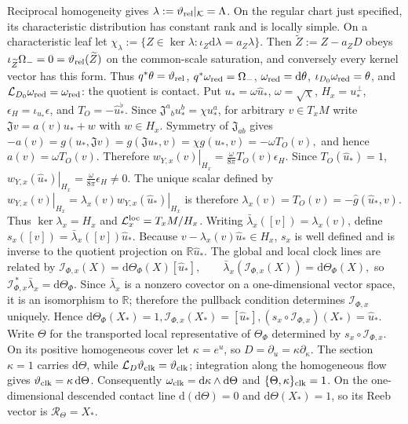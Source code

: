 \documentclass[aps,prl,reprint]{revtex4-2}
\newcommand{\dd}{\mathrm d}
\newcommand{\Lie}{\mathcal L}
\newcommand{\cK}{\mathcal K}
\begin{document}
Reciprocal homogeneity gives $\lambda:=\vartheta_{\rm rel}|_{\cK}=\Lambda$. On the regular chart just specified, its characteristic distribution has constant rank and is locally simple. On a characteristic leaf let $\chi_\lambda:=\{Z\in\ker\lambda:\iota_Z\dd\lambda=a_Z\lambda\}$. Then $\widetilde Z:=Z-a_ZD$ obeys $\iota_{\widetilde Z}\Omega_-=0=\vartheta_{\rm rel}(\widetilde Z)$ on the common-scale saturation, and conversely every kernel vector has this form. Thus $q^*\theta=\vartheta_{\rm rel}$, $q^*\omega_{\rm red}=\Omega_-$, $\omega_{\rm red}=\dd\theta$, $\iota_{D_0}\omega_{\rm red}=\theta$, and $\Lie_{D_0}\omega_{\rm red}=\omega_{\rm red}$: the quotient is contact. Put $u_*=\omega\widehat u_*$, $\omega=\sqrt{\chi}$, $H_x=u_*^\perp$, $\epsilon_H=\iota_{u_*}\epsilon$, and $T_O=-\widehat u_*^\flat$. Since $\mathfrak J^a{}_bu_*^b=\chi u_*^a$, for arbitrary $v\in T_xM$ write $\mathfrak Jv=a(v)u_*+w$ with $w\in H_x$. Symmetry of $\mathfrak J_{ab}$ gives
$-a(v) =g(u_*,\mathfrak Jv) =g(\mathfrak Ju_*,v) =\chi g(u_*,v) =-\omega T_O(v),$
and hence $a(v)=\omega T_O(v)$. Therefore
$\left.w_{Y,x}(v)\right|_{H_x} = \frac{\omega}{8\pi}T_O(v)\epsilon_H .$
Since $T_O(\widehat u_*)=1$,
$\left.w_{Y,x}(\widehat u_*)\right|_{H_x} = \frac{\omega}{8\pi}\epsilon_H\neq0.$
The unique scalar defined by
$\left.w_{Y,x}(v)\right|_{H_x} = \lambda_x(v) \left.w_{Y,x}(\widehat u_*)\right|_{H_x}$
is therefore
$\lambda_x(v)=T_O(v) =-\widehat g(\widehat u_*,v).$
Thus $\ker\lambda_x=H_x$ and $\mathcal L_x^{\rm loc}=T_xM/H_x$. Writing $\bar\lambda_x([v])=\lambda_x(v)$, define
$s_x([v])=\bar\lambda_x([v])\widehat u_*.$
Because $v-\lambda_x(v)\widehat u_*\in H_x$, $s_x$ is well defined and is inverse to the quotient projection on $\mathbb R\widehat u_*$. The global and local clock lines are related by
$\mathscr I_{\Phi,x}(X) = \dd\Theta_\Phi(X)[\widehat u_*], \qquad \bar\lambda_x(\mathscr I_{\Phi,x}(X)) = \dd\Theta_\Phi(X),$
so
$\mathscr I_{\Phi,x}^{\,*}\bar\lambda_x = \dd\Theta_\Phi .$
Since $\bar\lambda_x$ is a nonzero covector on a one-dimensional vector space, it is an isomorphism to $\mathbb R$; therefore the pullback condition determines $\mathscr I_{\Phi,x}$ uniquely. Hence
$\dd\Theta_\Phi(X_*)=1, \mathscr I_{\Phi,x}(X_*)=[\widehat u_*], (s_x\circ\mathscr I_{\Phi,x})(X_*)=\widehat u_* .$
Write $\Theta$ for the transported local representative of $\Theta_\Phi$ determined by $s_x\circ\mathscr I_{\Phi,x}$. On its positive homogeneous cover let $\kappa=e^u$, so $D=\partial_u=\kappa\partial_\kappa$. The section $\kappa=1$ carries $\dd\Theta$, while $\Lie_D\vartheta_{\rm clk}=\vartheta_{\rm clk}$; integration along the homogeneous flow gives $\vartheta_{\rm clk}=\kappa\,\dd\Theta$. Consequently $\omega_{\rm clk}=\dd\kappa\wedge\dd\Theta$ and $\{\Theta,\kappa\}_{\rm clk}=1$. On the one-dimensional descended contact line $\dd(\dd\Theta)=0$ and $\dd\Theta(X_*)=1$, so its Reeb vector is $\mathscr R_\Theta=X_*$.
\end{document}

